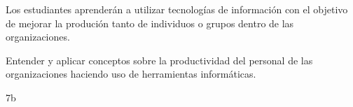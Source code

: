 \begin{syllabus}


\begin{justification}
Los estudiantes aprenderán a utilizar tecnologías de información con el objetivo de mejorar
la produción tanto de individuos o grupos dentro de las organizaciones.
\end{justification}

\begin{goals}
\item Entender y aplicar conceptos  sobre la productividad del personal de las organizaciones haciendo uso de herramientas informáticas.
\end{goals}

\begin{outcomes}
\end{outcomes}

\begin{unit}{\LUONEDef}{\LUONEBib}{7}{b}
   \begin{topics}
   	\item \ITONETopicONExONExONE
      \begin{subtopics}
      	\item \ITONETopicONExONExONExTWO
      	\item \ITONETopicONExONExONExTHREE
      \end{subtopics}	
      \item \ITONETopicONExONExTHREE
      \item \ITONETopicONExONExFOUR
      \item \ITTWOTopicONExTWOxONE
      \begin{subtopics}
	      \item \ITTWOTopicONExTWOxONExFOUR
      \end{subtopics}	
      \item \ITTWOTopicONExTWOxTHREE
      \item \ITFOURTopicONExFOURxONE
      \item \ITFOURTopicONExFOURxTWO
      \item \ITSIXTopicONExSIXxONE
      \item \ITSIXTopicONExSIXxTHREE
      \item \ITSIXTopicONExSIXxNINE
      \item \OMCTWOTopicTWOxTWOxONEONE
      \item \OMCTWOTopicTWOxTWOxONESIX
      \item \OMCTHREETopicTWOxTHREExTHREE
      \item \TDSONETopicTHREExONExTWO
      \item \TDSONETopicTHREExONExFOUR
      \item \TDSONETopicTHREExONExFIVE
   \end{topics}
	\LUONEGoal
\end{unit}


\end{syllabus}
